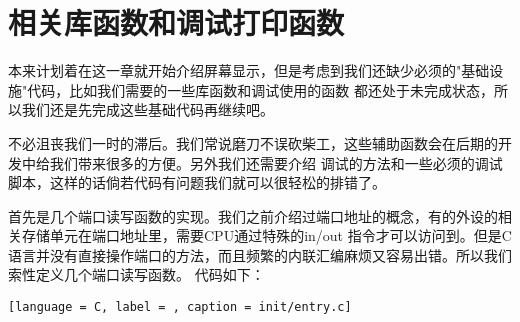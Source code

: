 
\section {相关库函数和调试打印函数}

\par 本来计划着在这一章就开始介绍屏幕显示，但是考虑到我们还缺少必须的"基础设施"代码，比如我们需要的一些库函数和调试使用的函数\allowbreak
都还处于未完成状态，所以我们还是先完成这些基础代码再继续吧。

\par 不必沮丧我们一时的滞后。我们常说磨刀不误砍柴工，这些辅助函数会在后期的开发中给我们带来很多的方便。另外我们还需要介绍\allowbreak
调试的方法和一些必须的调试脚本，这样的话倘若代码有问题我们就可以很轻松的排错了。

\par 首先是几个端口读写函数的实现。我们之前介绍过端口地址的概念，有的外设的相关存储单元在端口地址里，需要CPU通过特殊的in/out\allowbreak
指令才可以访问到。但是C语言并没有直接操作端口的方法，而且频繁的内联汇编麻烦又容易出错。所以我们索性定义几个端口读写函数。\allowbreak
代码如下：

\begin{lstlisting}[language = C, label = , caption = init/entry.c]

\end{lstlisting}


